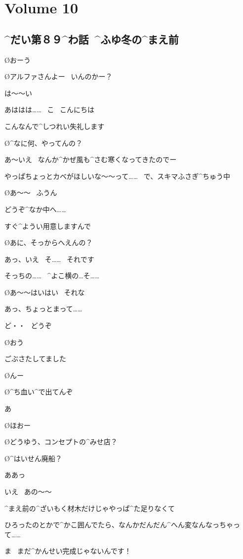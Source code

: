\section{Volume 10}

\subsection{^{だい}{第}８９^{わ}{話}\ ^{ふゆ}{冬}の^{まえ}{前}}

\page[6]
\O おーう

\O アルファさんよー
\ いんのかー？

\page
\A は〜〜い

\A あははは……
\ こ
\ こんにちは

\A こんなんで^{しつれい}{失礼}します

\O ^{なに}{何}、やってんの？

\A あ〜いえ
\ なんか^{かぜ}{風}も^{さむ}{寒}くなってきたのでー

\A やっぱちょっとカベがほしいな〜〜って……
\ で、スキマふさぎ^{ちゅう}{中}

\O あ〜〜
\ ふうん

\page
\A どうぞ^{なか}{中}へ……

\A すぐ^{ようい}{用意}しますんで

\O あに、そっからへえんの？

\A あっ、いえ
\ そ……
\ それです

\A そっちの……
\ ^{よこ}{横}の…そ……

\O あ〜〜はいはい
\ それな

\A あっ、ちょっとまって……

\page
\A ど・・
\ どうぞ

\O おう

\A ごぶさたしてました

\O んー

\O ^{ち}{血}い^{で}{出}てんぞ

\A あ

\page
\O ほおー

\O どうゆう、コンセプトの^{みせ}{店}？

\O ^{はいせん}{廃船}？

\A ああっ

\A いえ
\ あの〜〜

\page
\A ^{まえ}{前}の^{ざいもく}{材木}だけじゃやっぱ^{た}{足}りなくて

\A ひろったのとかで^{かこ}{囲}んでたら、なんかだんだん^{へん}{変}なんなっちゃって……

\A ま
\ まだ^{かんせい}{完成}じゃないんです！

